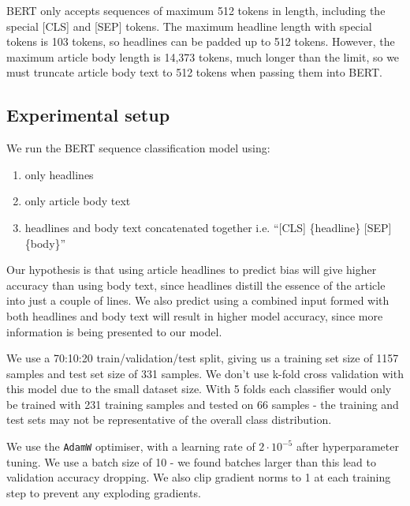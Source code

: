 BERT only accepts sequences of maximum 512 tokens in length, including the special [CLS] and [SEP] tokens. The maximum headline length with special tokens is 103 tokens, so headlines can be padded up to 512 tokens. However, the maximum article body length is 14,373 tokens, much longer than the limit, so we must truncate article body text to 512 tokens when passing them into BERT.

\subsection{Experimental setup}

We run the BERT sequence classification model using:

\begin{enumerate}
    \item only headlines
    \item only article body text
    \item headlines and body text concatenated together i.e. ``[CLS] \{headline\} [SEP] \{body\}''
\end{enumerate}

Our hypothesis is that using article headlines to predict bias will give higher accuracy than using body text, since headlines distill the essence of the article into just a couple of lines. We also predict using a combined input formed with both headlines and body text will result in higher model accuracy, since more information is being presented to our model.

We use a 70:10:20 train/validation/test split, giving us a training set size of 1157 samples and test set size of 331 samples. We don't use k-fold cross validation with this model due to the small dataset size. With 5 folds each classifier would only be trained with 231 training samples and tested on 66 samples - the training and test sets may not be representative of the overall class distribution.

We use the \texttt{AdamW} \cite{adamw} optimiser, with a learning rate of $ 2 \cdot 10^{-5} $ after hyperparameter tuning. We use a batch size of 10 - we found batches larger than this lead to validation accuracy dropping. We also clip gradient norms to 1 at each training step to prevent any exploding gradients.

